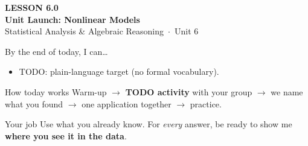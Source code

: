 \documentclass[aspectratio=169, 11pt]{beamer}
\begin{document}
{
\begin{frame}[plain]
  \vspace{2.8cm}\hspace{0.55cm}%
  \begin{minipage}{0.9\textwidth}
    {\color{goldacc}\bfseries\small LESSON 6.0}\\[0.5cm]
    {\color{white}\bfseries\LARGE Unit Launch: Nonlinear Models}\\[1.2cm]
    {\color{frostmid}\small Statistical Analysis \& Algebraic Reasoning~$\cdot$~Unit 6}
  \end{minipage}
\end{frame}
}

\newcommand{\redink}[1]{{\color{redacc}\bfseries #1}}

\begin{frame}[t, plain]
  By the end of today, I can\ldots
  \begin{itemize}\setlength{\itemsep}{6pt}
    \item TODO: plain-language target (no formal vocabulary).
  \end{itemize}
  \begin{block}{How today works}
    Warm-up $\to$ \textbf{TODO activity} with your group $\to$ we name what you found $\to$
    one application together $\to$ practice.
  \end{block}
\end{frame}

\begin{frame}[t, plain]
\end{frame}

\begin{frame}[t, plain]
  \begin{block}{Your job}
    Use what you already know. For \emph{every} answer, be ready to show me
    \textbf{where you see it in the data}.
  \end{block}
\end{frame}
\end{document}
